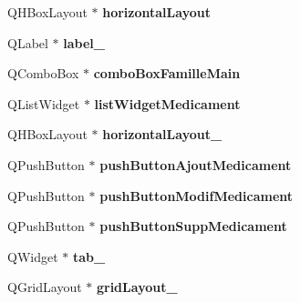 \begin{DoxyCompactItemize}
\item 
\hypertarget{classUi__MainWindow_acd6fdc9ebacc4b25b834162380d75ce8}{Q\-H\-Box\-Layout $\ast$ {\bfseries horizontal\-Layout}}\label{classUi__MainWindow_acd6fdc9ebacc4b25b834162380d75ce8}

\item 
\hypertarget{classUi__MainWindow_a2e2516d755e4dd53fc905dabddf2738a}{Q\-Label $\ast$ {\bfseries label\-\_}}\label{classUi__MainWindow_a2e2516d755e4dd53fc905dabddf2738a}

\item 
\hypertarget{classUi__MainWindow_a224d366a76eb05bb5b7fa020f5b9dbb1}{Q\-Combo\-Box $\ast$ {\bfseries combo\-Box\-Famille\-Main}}\label{classUi__MainWindow_a224d366a76eb05bb5b7fa020f5b9dbb1}

\item 
\hypertarget{classUi__MainWindow_a3a90f6631359f1f32a482b0df51617ef}{Q\-List\-Widget $\ast$ {\bfseries list\-Widget\-Medicament}}\label{classUi__MainWindow_a3a90f6631359f1f32a482b0df51617ef}

\item 
\hypertarget{classUi__MainWindow_a80867018070156432923d0266cc9fe25}{Q\-H\-Box\-Layout $\ast$ {\bfseries horizontal\-Layout\-\_}}\label{classUi__MainWindow_a80867018070156432923d0266cc9fe25}

\item 
\hypertarget{classUi__MainWindow_a10f036266abf36062ce6b983dd25615d}{Q\-Push\-Button $\ast$ {\bfseries push\-Button\-Ajout\-Medicament}}\label{classUi__MainWindow_a10f036266abf36062ce6b983dd25615d}

\item 
\hypertarget{classUi__MainWindow_a2fdc675a714e0cf6e9ab3c44a9410022}{Q\-Push\-Button $\ast$ {\bfseries push\-Button\-Modif\-Medicament}}\label{classUi__MainWindow_a2fdc675a714e0cf6e9ab3c44a9410022}

\item 
\hypertarget{classUi__MainWindow_a397e9b4283f7bf302dd0ec9f3844229b}{Q\-Push\-Button $\ast$ {\bfseries push\-Button\-Supp\-Medicament}}\label{classUi__MainWindow_a397e9b4283f7bf302dd0ec9f3844229b}

\item 
\hypertarget{classUi__MainWindow_a83495b23cbc6810f81978dc0d584b810}{Q\-Widget $\ast$ {\bfseries tab\-\_}}\label{classUi__MainWindow_a83495b23cbc6810f81978dc0d584b810}

\item 
\hypertarget{classUi__MainWindow_a8ee86315639f324b17708efc7dbe8b19}{Q\-Grid\-Layout $\ast$ {\bfseries grid\-Layout\-\_}}\label{classUi__MainWindow_a8ee86315639f324b17708efc7dbe8b19}


\end{DoxyCompactItemize}
